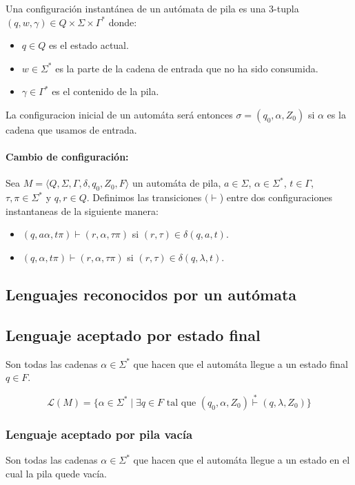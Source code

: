 Una configuración instantánea de un autómata de pila es una 3-tupla $(q, w, \gamma) \in Q\times\Sigma\times\Gamma^*$ donde:
\begin{itemize}
  \item $q \in Q$ es el estado actual.
  \item $w \in \Sigma^*$ es la parte de la cadena de entrada que no ha sido consumida.
  \item $\gamma \in \Gamma^*$ es el contenido de la pila.
\end{itemize}

La configuracion inicial de un automáta será entonces $\sigma = (q_0, \alpha, Z_0)$ si \(\alpha\) es la cadena que usamos de entrada.

\paragraph{Cambio de configuración:} Sea $M=\langle Q, \Sigma, \Gamma, \delta, q_0, Z_0, F \rangle$ un automáta de pila, \(a\in\Sigma\), \(\alpha\in\Sigma^*\), \(t\in\Gamma\), \(\tau,\pi\in\Sigma^*\) y \(q,r\in Q\). Definimos las transiciones \((\vdash\)) entre dos configuraciones instantaneas de la siguiente manera:
\begin{itemize}
  \item \((q, a\alpha, t\pi)\vdash (r, \alpha, \tau\pi)\) si \((r,\tau)\in\delta(q,a,t)\).
  \item \((q,   \alpha, t\pi)\vdash (r, \alpha, \tau\pi)\) si \((r,\tau)\in\delta(q,\lambda,t)\).
\end{itemize}

\subsection{Lenguajes reconocidos por un autómata}
\subsection{Lenguaje aceptado por estado final}
Son todas las cadenas \(\alpha\in\Sigma^*\) que hacen que el automáta llegue a un estado final \(q\in F\).

\[ \mathcal{L}(M) = \{ \alpha \in \Sigma^* \mid \exists q \in F \text{ tal que } (q_0, \alpha, Z_0) \overset{*}{\vdash}  (q, \lambda, Z_0) \} \]

\subsubsection{Lenguaje aceptado por pila vacía}
Son todas las cadenas \(\alpha\in\Sigma^*\) que hacen que el automáta llegue a un estado en el cual la pila quede vacía.

